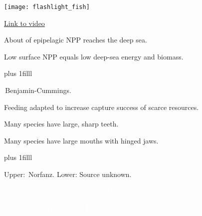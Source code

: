 \documentclass[t]{beamer}
\begin{document}
{
\begin{frame}[c]
	\begin{multicols}{2}
	\columnbreak
		\texttt{[image: flashlight\_fish]}
	\end{multicols}

\vfilll
\hfill \tiny\textcolor{white}{\href{https://youtu.be/VlyGpg35jMA}{Link to video}}
\end{frame}}




{
\begin{frame}[t]{About  of epipelagic NPP reaches the deep sea.}

\vspace*{63mm}

\hangpara Low surface NPP equals low deep-sea energy and biomass.

\vskip0pt plus 1filll

\hfill\tiny\textcopyright\,Benjamin-Cummings.
\end{frame}}


{
\begin{frame}[t]{Feeding adapted to increase capture success of scarce resources.}

\hangpara\parbox{0.45\textwidth}{Many species have large, sharp teeth.}

\hangpara\parbox{0.45\textwidth}{Many species have large mouths with hinged jaws.}

\vskip0pt plus 1filll

\tiny Upper: \textcopyright\,Norfanz. Lower: Source unknown.
\end{frame}}


{
\begin{frame}[b]{\textcolor{white}{Many aphotic fishes have enlarged stomachs.}}

\tiny\textcolor{white}{\textcopyright\,Natural History Museum, London.}
\end{frame}}

{
\begin{frame}[b]
\end{frame}}
\end{document}
